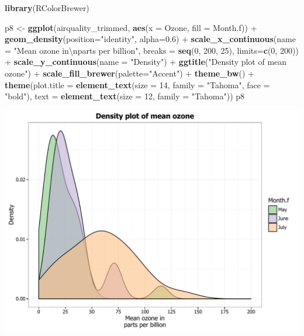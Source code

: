 \documentclass[]{article}
\newenvironment{Shaded}{\begin{snugshade}}{\end{snugshade}}
\newcommand{\KeywordTok}[1]{\textcolor[rgb]{0.13,0.29,0.53}{\textbf{{#1}}}}
\newcommand{\DataTypeTok}[1]{\textcolor[rgb]{0.13,0.29,0.53}{{#1}}}
\newcommand{\DecValTok}[1]{\textcolor[rgb]{0.00,0.00,0.81}{{#1}}}
\newcommand{\FloatTok}[1]{\textcolor[rgb]{0.00,0.00,0.81}{{#1}}}
\newcommand{\CharTok}[1]{\textcolor[rgb]{0.31,0.60,0.02}{{#1}}}
\newcommand{\StringTok}[1]{\textcolor[rgb]{0.31,0.60,0.02}{{#1}}}
\newcommand{\NormalTok}[1]{{#1}}
\begin{document}
\begin{Shaded}
\begin{Highlighting}[]
\KeywordTok{library}\NormalTok{(RColorBrewer)}

\NormalTok{p8 <-}\StringTok{ }\KeywordTok{ggplot}\NormalTok{(airquality_trimmed, }\KeywordTok{aes}\NormalTok{(}\DataTypeTok{x =} \NormalTok{Ozone, }\DataTypeTok{fill =} \NormalTok{Month.f)) +}\StringTok{ }
\StringTok{      }\KeywordTok{geom_density}\NormalTok{(}\DataTypeTok{position=}\StringTok{"identity"}\NormalTok{, }\DataTypeTok{alpha=}\FloatTok{0.6}\NormalTok{) +}
\StringTok{      }\KeywordTok{scale_x_continuous}\NormalTok{(}\DataTypeTok{name =} \StringTok{"Mean ozone in}\CharTok{\textbackslash{}n}\StringTok{parts per billion"}\NormalTok{,}
                         \DataTypeTok{breaks =} \KeywordTok{seq}\NormalTok{(}\DecValTok{0}\NormalTok{, }\DecValTok{200}\NormalTok{, }\DecValTok{25}\NormalTok{),}
                         \DataTypeTok{limits=}\KeywordTok{c}\NormalTok{(}\DecValTok{0}\NormalTok{, }\DecValTok{200}\NormalTok{)) +}
\StringTok{      }\KeywordTok{scale_y_continuous}\NormalTok{(}\DataTypeTok{name =} \StringTok{"Density"}\NormalTok{) +}
\StringTok{      }\KeywordTok{ggtitle}\NormalTok{(}\StringTok{"Density plot of mean ozone"}\NormalTok{) +}
\StringTok{      }\KeywordTok{scale_fill_brewer}\NormalTok{(}\DataTypeTok{palette=}\StringTok{"Accent"}\NormalTok{) +}
\StringTok{      }\KeywordTok{theme_bw}\NormalTok{() +}
\StringTok{      }\KeywordTok{theme}\NormalTok{(}\DataTypeTok{plot.title =} \KeywordTok{element_text}\NormalTok{(}\DataTypeTok{size =} \DecValTok{14}\NormalTok{, }\DataTypeTok{family =} \StringTok{"Tahoma"}\NormalTok{, }\DataTypeTok{face =} \StringTok{"bold"}\NormalTok{), }
            \DataTypeTok{text =} \KeywordTok{element_text}\NormalTok{(}\DataTypeTok{size =} \DecValTok{12}\NormalTok{, }\DataTypeTok{family =} \StringTok{"Tahoma"}\NormalTok{))}
\NormalTok{p8}
\end{Highlighting}
\end{Shaded}

\begin{center}\includegraphics{0_all_posts_pdf/density_16-1} \end{center}
\end{document}
